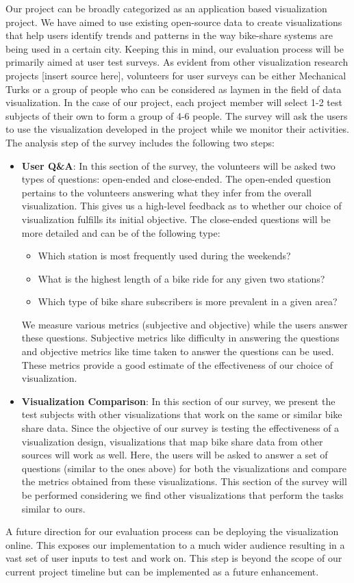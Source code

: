 Our project can be broadly categorized as an application based visualization project. We have aimed to use existing open-source data to create visualizations that help users identify trends and patterns in the way bike-share systems are being used in a certain city. Keeping this in mind, our evaluation process will be primarily aimed at user test surveys.
As evident from other visualization research projects [insert source here], volunteers for user surveys can be either Mechanical Turks or a group of people who can be considered as laymen in the field of data visualization. In the case of our project, each project member will select 1-2 test subjects of their own to form a group of 4-6 people. The survey will ask the users to use the visualization developed in the project while we monitor their activities. The analysis step of the survey includes the following two steps:
\begin{itemize}
	\item \textbf{User Q\&A}: In this section of the survey, the volunteers will be asked two types of questions: open-ended and close-ended. The open-ended question pertains to the volunteers answering what they infer from the overall visualization. This gives us a high-level feedback as to whether our choice of visualization fulfills its initial objective. The close-ended questions will be more detailed and can be of the following type:
	\begin{itemize}
		\item Which station is most frequently used during the weekends?
		\item What is the highest length of a bike ride for any given two stations?
		\item Which type of bike share subscribers is more prevalent in a given area?
	\end{itemize}
	We measure various metrics (subjective and objective) while the users answer these questions. Subjective metrics like difficulty in answering the questions and objective metrics like time taken to answer the questions can be used. These metrics provide a good estimate of the effectiveness of our choice of visualization.
	\item \textbf{Visualization Comparison}: In this section of our survey, we present the test subjects with other visualizations that work on the same or similar bike share data. Since the objective of our survey is testing the effectiveness of a visualization design, visualizations that map bike share data from other sources will work as well. Here, the users will be asked to answer a set of questions (similar to the ones above) for both the visualizations and compare the metrics obtained from these visualizations. This section of the survey will be performed considering we find other visualizations that perform the tasks similar to ours.
\end{itemize}
A future direction for our evaluation process can be deploying the visualization online. This exposes our implementation to a much wider audience resulting in a vast set of user inputs to test and work on. This step is beyond the scope of our current project timeline but can be implemented as a future enhancement.